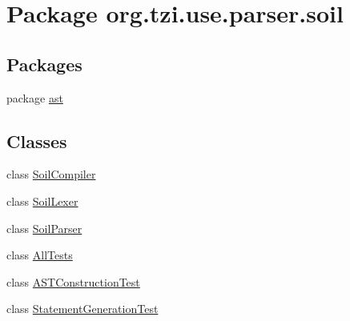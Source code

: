 \hypertarget{namespaceorg_1_1tzi_1_1use_1_1parser_1_1soil}{\section{Package org.\-tzi.\-use.\-parser.\-soil}
\label{namespaceorg_1_1tzi_1_1use_1_1parser_1_1soil}
}
\subsection*{Packages}
\begin{DoxyCompactItemize}
\item 
package \hyperlink{namespaceorg_1_1tzi_1_1use_1_1parser_1_1soil_1_1ast}{ast}
\end{DoxyCompactItemize}
\subsection*{Classes}
\begin{DoxyCompactItemize}
\item 
class \hyperlink{classorg_1_1tzi_1_1use_1_1parser_1_1soil_1_1_soil_compiler}{Soil\-Compiler}
\item 
class \hyperlink{classorg_1_1tzi_1_1use_1_1parser_1_1soil_1_1_soil_lexer}{Soil\-Lexer}
\item 
class \hyperlink{classorg_1_1tzi_1_1use_1_1parser_1_1soil_1_1_soil_parser}{Soil\-Parser}
\item 
class \hyperlink{classorg_1_1tzi_1_1use_1_1parser_1_1soil_1_1_all_tests}{All\-Tests}
\item 
class \hyperlink{classorg_1_1tzi_1_1use_1_1parser_1_1soil_1_1_a_s_t_construction_test}{A\-S\-T\-Construction\-Test}
\item 
class \hyperlink{classorg_1_1tzi_1_1use_1_1parser_1_1soil_1_1_statement_generation_test}{Statement\-Generation\-Test}
\end{DoxyCompactItemize}
